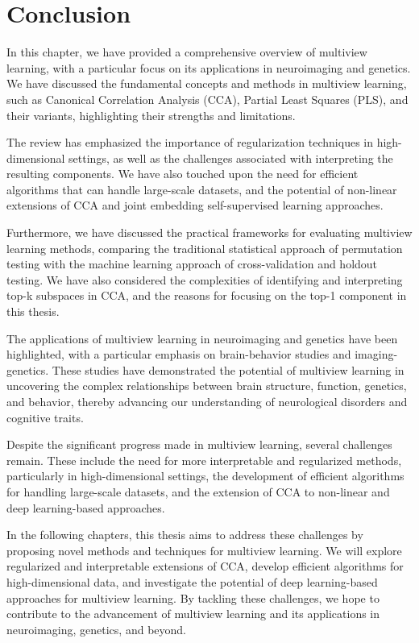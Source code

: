 \section{Conclusion}

In this chapter, we have provided a comprehensive overview of multiview learning, with a particular focus on its applications in neuroimaging and genetics. We have discussed the fundamental concepts and methods in multiview learning, such as Canonical Correlation Analysis (CCA), Partial Least Squares (PLS), and their variants, highlighting their strengths and limitations.

The review has emphasized the importance of regularization techniques in high-dimensional settings, as well as the challenges associated with interpreting the resulting components. We have also touched upon the need for efficient algorithms that can handle large-scale datasets, and the potential of non-linear extensions of CCA and joint embedding self-supervised learning approaches.

Furthermore, we have discussed the practical frameworks for evaluating multiview learning methods, comparing the traditional statistical approach of permutation testing with the machine learning approach of cross-validation and holdout testing. We have also considered the complexities of identifying and interpreting top-k subspaces in CCA, and the reasons for focusing on the top-1 component in this thesis.

The applications of multiview learning in neuroimaging and genetics have been highlighted, with a particular emphasis on brain-behavior studies and imaging-genetics. These studies have demonstrated the potential of multiview learning in uncovering the complex relationships between brain structure, function, genetics, and behavior, thereby advancing our understanding of neurological disorders and cognitive traits.

Despite the significant progress made in multiview learning, several challenges remain. These include the need for more interpretable and regularized methods, particularly in high-dimensional settings, the development of efficient algorithms for handling large-scale datasets, and the extension of CCA to non-linear and deep learning-based approaches.

In the following chapters, this thesis aims to address these challenges by proposing novel methods and techniques for multiview learning. We will explore regularized and interpretable extensions of CCA, develop efficient algorithms for high-dimensional data, and investigate the potential of deep learning-based approaches for multiview learning. By tackling these challenges, we hope to contribute to the advancement of multiview learning and its applications in neuroimaging, genetics, and beyond.
